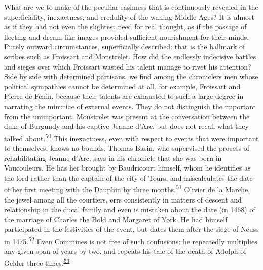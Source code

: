 What are we to make of the peculiar rashness that is continuously
revealed in the superficiality, inexactness, and credulity of the waning
Middle Ages? It is almost as if they had not even the slightest need for
real thought, as if the passage of fleeting and dream-like images
provided sufficient nourishment for their minds. Purely outward
circumstances, superficially described: that is the hallmark of scribes
such as Froissart and Monstrelet. How did the endlessly indecisive
battles and sieges over which Froissart wasted his talent manage to
rivet his attention? Side by side with determined partisans, we find
among the chroniclers men whose political sympathies cannot be
determined at all, for example, Froissart and Pierre de Fenin, because
their talents are exhausted to such a large degree in narrating the
minutiae of external events. They do not distinguish the important from
the unimportant. Monstrelet was present at the conversation between the
duke of Burgundy and his captive Jeanne d'Arc, but does not recall what
they talked
about.\textsuperscript{\protect\hypertarget{18_Chapter_Eleven__THE_FORMS_OF_THO.xhtmlux5cux23id_533}{\protect\hyperlink{23_NOTES.xhtmlux5cux23id_534}{50}}}
This inexactness, even with respect to events that were important to
themselves, knows no bounds. Thomas Basin, who supervised the process of
rehabilitating Jeanne d'Arc, says in his chronicle that she was born in
Vaucouleurs. He has her brought by Baudricourt himself, whom he
identifies as the lord rather than the captain of the city of Tours, and
miscalculates the date of her first meeting with the Dauphin by three
months.\textsuperscript{\protect\hypertarget{18_Chapter_Eleven__THE_FORMS_OF_THO.xhtmlux5cux23id_531}{\protect\hyperlink{23_NOTES.xhtmlux5cux23id_532}{51}}}
Olivier de la Marche, the jewel among all the courtiers, errs
consistently in matters of descent and relationship in the ducal family
and even is mistaken about the date (in 1468) of the marriage of Charles
the Bold and Margaret of York. He had himself participated in the
festivities of the event, but dates them after the siege of Neuss in
1475.\textsuperscript{\protect\hypertarget{18_Chapter_Eleven__THE_FORMS_OF_THO.xhtmlux5cux23id_529}{\protect\hyperlink{23_NOTES.xhtmlux5cux23id_530}{52}}}
Even Commines is not free of such confusions: he repeatedly multiplies
any given span of years by two, and repeats his tale of the death of
Adolph of Gelder three
times.\textsuperscript{\protect\hypertarget{18_Chapter_Eleven__THE_FORMS_OF_THO.xhtmlux5cux23id_527}{\protect\hyperlink{23_NOTES.xhtmlux5cux23id_528}{53}}}

